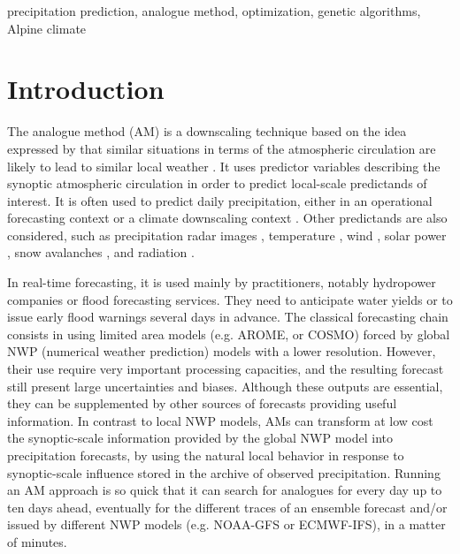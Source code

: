 \documentclass[review]{elsarticle}
\begin{document}
\begin{frontmatter}
\begin{keyword}
precipitation prediction\sep
analogue method\sep
optimization\sep
genetic algorithms\sep
Alpine climate
\end{keyword}

\end{frontmatter}

\linenumbers

\section{Introduction}
\label{sec:intro}

The analogue method (AM) is a downscaling technique based on the idea expressed by \citet{Lorenz1956, Lorenz1969} that similar situations in terms of the atmospheric circulation are likely to lead to similar local weather \citep{Duband1970}. It uses predictor variables describing the synoptic atmospheric circulation in order to predict local-scale predictands of interest. It is often used to predict daily precipitation, either in an operational forecasting context \citep[e.g.,][]{Guilbaud1997, Bontron2005, Hamill2006, Bliefernicht2010, Marty2012, Horton2012, Horton2016a, Hamill2015, BenDaoud2016} or a climate downscaling context \citep[e.g.,][]{Radanovics2013, Chardon2014, Dayon2015, Raynaud2016b}. Other predictands are also considered, such as precipitation radar images \citep{Panziera2011,Foresti2015a}, temperature \citep{Radinovic1975, Woodcock1980, Kruizinga1983, DelleMonache2013, Caillouet2016, Raynaud2016b}, wind \citep{Gordon1987, DelleMonache2013, DelleMonache2011, Vanvyve2015, Alessandrini2015, Junk2015, Junk2015c}, solar power \citep{Alessandrini2015a, Bessa2015}, snow avalanches \citep{Obled1980, Bolognesi1993}, and radiation \citep{Bois1981, Raynaud2016b}.

In real-time forecasting, it is used mainly by practitioners, notably hydropower companies or flood forecasting services. They need to anticipate water yields or to issue early flood warnings several days in advance. The classical forecasting chain consists in using limited area models (e.g. AROME, or COSMO) forced by global NWP (numerical weather prediction) models with a lower resolution. However, their use require very important processing capacities, and the resulting forecast still present large uncertainties and biases. Although these outputs are essential, they can be supplemented by other sources of forecasts providing useful information. In contrast to local NWP models, AMs can transform at low cost the synoptic-scale information provided by the global NWP model into precipitation forecasts, by using the natural local behavior in response to synoptic-scale influence stored in the archive of observed precipitation. Running an AM approach is so quick that it can search for analogues for every day up to ten days ahead, eventually for the different traces of an ensemble forecast and/or issued by different NWP models (e.g. NOAA-GFS or ECMWF-IFS), in a matter of minutes.
\end{document}
